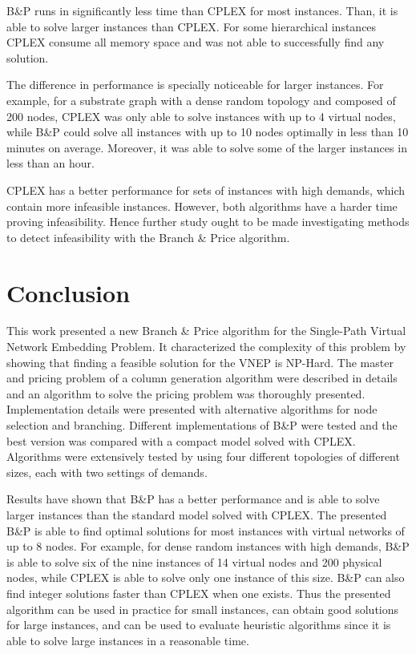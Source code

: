 \documentclass[conference]{IEEEtran}
\begin{document}
B\&P runs in significantly less time than CPLEX for most instances.%
Than, it is able to solve larger instances than CPLEX. 
For some hierarchical instances CPLEX consume all memory space and was not able to successfully find any solution.

The difference in performance is specially noticeable for larger instances. 
For example, for a substrate graph with a dense random topology and composed of 200 nodes, CPLEX was only able to solve instances with up to 4 virtual nodes, while B\&P could solve all instances with up to 10 nodes optimally in less than 10 minutes on average. 
Moreover, it was able to solve some of the larger instances in less than an hour.

CPLEX has a better performance for sets of instances with high demands, which contain more infeasible instances.
However, both algorithms have a harder time proving infeasibility.
Hence further study ought to be made investigating methods to detect infeasibility with the Branch \& Price algorithm.


\section{Conclusion}
\label{sec:conclusion}
This work presented a new Branch \& Price algorithm for the Single-Path Virtual Network Embedding Problem.
It characterized the complexity of this problem by showing that finding a feasible solution for the VNEP is NP-Hard.
The master and pricing problem of a column generation algorithm were described in details and an algorithm to solve the pricing problem was thoroughly presented.
Implementation details were presented with alternative algorithms for node selection and branching.
Different implementations of B\&P were tested and the best version was compared with a compact model solved with CPLEX.
Algorithms were extensively tested by using four different topologies of different sizes, each with two settings of demands.

{ \color{red}
Results have shown that B\&P has a better performance and is able to solve larger instances than the standard model solved with CPLEX.
The presented B\&P is able to find optimal solutions for most instances with virtual networks of up to $8$ nodes. 
For example, for dense random instances with high demands, B\&P is able to solve six of the nine instances of 14 virtual nodes and 200 physical nodes, while CPLEX is able to solve only one instance of this size.
B\&P can also find integer solutions faster than CPLEX when one exists.
Thus the presented algorithm can be used in practice for small instances, can obtain good solutions for large instances, and can be used to evaluate heuristic algorithms since it is able to solve large instances in a reasonable time.
}
\end{document}
